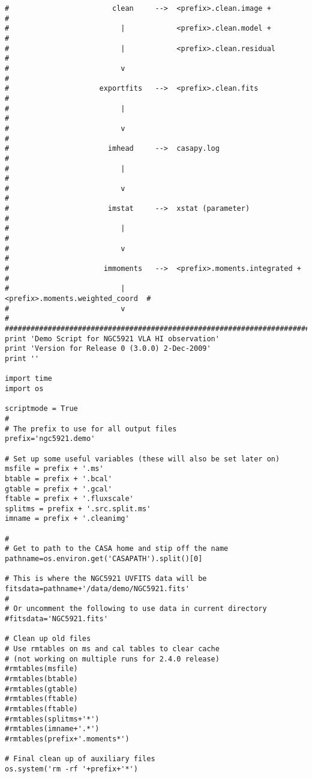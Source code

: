 \begin{verbatim}
#                        clean     -->  <prefix>.clean.image +           #
#                          |            <prefix>.clean.model +           #
#                          |            <prefix>.clean.residual          #
#                          v                                             #
#                     exportfits   -->  <prefix>.clean.fits              #
#                          |                                             #
#                          v                                             #
#                       imhead     -->  casapy.log                       #
#                          |                                             #
#                          v                                             #
#                       imstat     -->  xstat (parameter)                #
#                          |                                             #
#                          v                                             #
#                      immoments   -->  <prefix>.moments.integrated +    #
#                          |            <prefix>.moments.weighted_coord  #
#                          v                                             #
##########################################################################
print 'Demo Script for NGC5921 VLA HI observation'
print 'Version for Release 0 (3.0.0) 2-Dec-2009'
print ''

import time
import os

scriptmode = True
# 
# The prefix to use for all output files
prefix='ngc5921.demo'

# Set up some useful variables (these will also be set later on)
msfile = prefix + '.ms'
btable = prefix + '.bcal'
gtable = prefix + '.gcal'
ftable = prefix + '.fluxscale'
splitms = prefix + '.src.split.ms'
imname = prefix + '.cleanimg'

#
# Get to path to the CASA home and stip off the name
pathname=os.environ.get('CASAPATH').split()[0]

# This is where the NGC5921 UVFITS data will be
fitsdata=pathname+'/data/demo/NGC5921.fits'
#
# Or uncomment the following to use data in current directory
#fitsdata='NGC5921.fits'

# Clean up old files
# Use rmtables on ms and cal tables to clear cache
# (not working on multiple runs for 2.4.0 release)
#rmtables(msfile)
#rmtables(btable)
#rmtables(gtable)
#rmtables(ftable)
#rmtables(ftable)
#rmtables(splitms+'*')
#rmtables(imname+'.*')
#rmtables(prefix+'.moments*')

# Final clean up of auxiliary files
os.system('rm -rf '+prefix+'*')


\end{verbatim}
